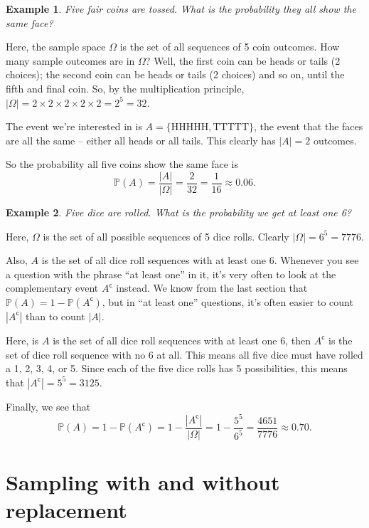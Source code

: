 \documentclass[
  a4paper,
]{book}
\theoremstyle{definition}
\theoremstyle{definition}
\newtheorem{example}{Example}[chapter]
\theoremstyle{definition}
\theoremstyle{definition}
\theoremstyle{remark}
\begin{document}
\begin{example}
\emph{Five fair coins are tossed. What is the probability they all show the same face?}

Here, the sample space \(\Omega\) is the set of all sequences of 5 coin outcomes. How many sample outcomes are in \(\Omega\)? Well, the first coin can be heads or tails (2 choices); the second coin can be heads or tails (2 choices) and so on, until the fifth and final coin. So, by the multiplication principle, \(|\Omega| = 2 \times 2 \times 2 \times 2 \times 2 = 2^5 = 32\).

The event we're interested in is \(A = \{\text{HHHHH}, \text{TTTTT}\}\), the event that the faces are all the same -- either all heads or all tails. This clearly has \(|A| = 2\) outcomes.

So the probability all five coins show the same face is
\[ \mathbb P(A) = \frac{|A|}{|\Omega|} = \frac{2}{32} = \frac{1}{16} \approx 0.06. \]
\end{example}

\begin{example}
\emph{Five dice are rolled. What is the probability we get at least one 6?}

Here, \(\Omega\) is the set of all possible sequences of 5 dice rolls. Clearly \(|\Omega| = 6^5 = 7776\).

Also, \(A\) is the set of all dice roll sequences with at least one 6. Whenever you see a question with the phrase ``at least one'' in it, it's very often to look at the complementary event \(A^\mathsf{c}\) instead. We know from the last section that \(\mathbb P(A) = 1 - \mathbb P(A^\mathsf{c})\), but in ``at least one'' questions, it's often easier to count \(|A^\mathsf{c}|\) than to count \(|A|\).

Here, is \(A\) is the set of all dice roll sequences with at least one 6, then \(A^\mathsf{c}\) is the set of dice roll sequence with no 6 at all. This means all five dice must have rolled a 1, 2, 3, 4, or 5. Since each of the five dice rolls has 5 possibilities, this means that \(|A^\mathsf{c}| = 5^5 = 3125\).

Finally, we see that
\[ \mathbb P(A) = 1 - \mathbb P(A^\mathsf{c}) = 1 - \frac{|A^\mathsf{c}|}{|\Omega|} = 1 - \frac{5^5}{6^5} = \frac{4651}{7776} \approx 0.70 .\]
\end{example}

\hypertarget{sampling}{%
\section{Sampling with and without replacement}\label{sampling}}
\end{document}
